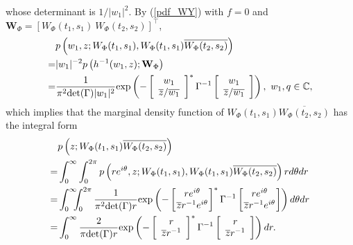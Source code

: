 \documentclass{amsart}
\begin{document}
whose determinant is $1/|w_{1}|^{2}$.
By (\ref{pdf_WY}) with $f=0$
and $\mathbf{W}_{\Phi} = [W_{\Phi}(t_{1},s_{1})\ W_{\Phi}(t_{2},s_{2})]^{\top}$,
\begin{align}\notag
&p\left(w_{1},z;W_{\Phi}(t_{1},s_{1}),W_{\Phi}(t_{1},s_{1})\overline{W_{\Phi}(t_{2},s_{2})}\right)
\\\notag=& |w_{1}|^{-2} p\left(h^{-1}(w_{1},z);\mathbf{W}_{\Phi}\right)
\\\notag=&
\frac{1}{\pi^{2}\textup{det}(\Gamma)|w_{1}|^{2}}
\textup{exp}\left(-
\left[\begin{array}{cc}w_{1}\\ \overline{z}/\overline{w_{1}}\end{array}\right]^{*}
\Gamma^{-1}
\left[\begin{array}{cc}w_{1}\\ \overline{z}/\overline{w_{1}}\end{array}\right]\right),\ w_{1},q\in \mathbb{C},
\end{align}
which implies that the marginal density function of $W_{\Phi}(t_{1},s_{1})\overline{W_{\Phi}(t_{2},s_{2})}$ has the integral form
\begin{align}\label{null_product:phase}
&p\left(z;W_{\Phi}(t_{1},s_{1})\overline{W_{\Phi}(t_{2},s_{2})}\right)
\\\notag=&\int_{0}^{\infty}\int_{0}^{2\pi}
p\left(re^{i\theta},z; W_{\Phi}(t_{1},s_{1}),W_{\Phi}(t_{1},s_{1})\overline{W_{\Phi}(t_{2},s_{2})}\right)r d\theta dr
\\\notag=&
\int_{0}^{\infty}\hspace{-0.2cm}\int_{0}^{2\pi} \frac{1}{\pi^{2}\textup{det}(\Gamma)r}
\textup{exp}\left(-
\left[\hspace{-0.15cm}\begin{array}{cc}re^{i\theta}\\ \overline{z}r^{-1}e^{i\theta}\end{array}\hspace{-0.15cm}\right]^{*}
\Gamma^{-1}
\left[\hspace{-0.15cm}\begin{array}{cc}re^{i\theta}\\ \overline{z}r^{-1}e^{i\theta}\end{array}\hspace{-0.15cm}\right]\right)d\theta dr
\\\notag=&
\int_{0}^{\infty}\frac{2}{\pi\textup{det}(\Gamma)r}
\textup{exp}\left(-
\left[\begin{array}{cc}r\\ \overline{z}r^{-1}\end{array}\right]^{*}
\Gamma^{-1}
\left[\begin{array}{cc}r\\ \overline{z}r^{-1}\end{array}\right]\right)dr.
\end{align}
\end{document}

